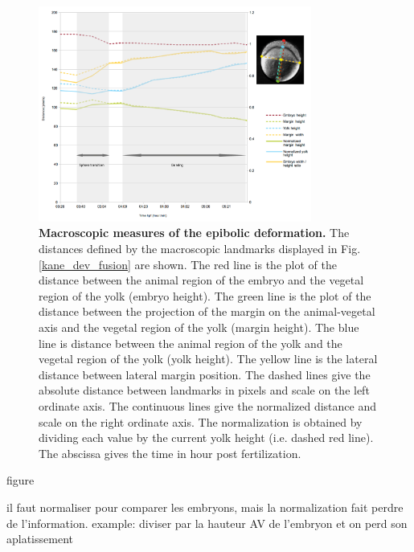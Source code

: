 \begin{figure}
\begin{center}
\includegraphics[width=0.8\textwidth]{../../images/Cases_Studies/Case_4_intercalation/kane_dev/fusion_plot.png}
\end{center}
\caption{\textbf{Macroscopic measures of the epibolic deformation.} The distances defined by the macroscopic landmarks displayed in Fig. \ref{kane_dev_fusion} are shown. The red line is the plot of the distance between the animal region of the embryo and the vegetal region of the yolk (embryo height). The green line is the plot of the distance between the projection of the margin on the animal-vegetal axis and the vegetal region of the yolk (margin height). The blue line is distance between the animal region of the yolk and the vegetal region of the yolk (yolk height). The yellow line is the lateral distance between lateral margin position. The dashed lines give the absolute distance between landmarks in pixels and scale on the left ordinate axis. The continuous lines give the normalized distance and scale on the right ordinate axis. The normalization is obtained by dividing each value by the current yolk height (i.e. dashed red line). The abscissa gives the time in hour post fertilization.}
\label{kane_dev_fusion_plot}
\end{figure}    figure   

  il faut normaliser pour comparer les embryons, mais la normalization fait perdre de l'information.  example: diviser par la hauteur AV de l'embryon et on perd son aplatissement 

